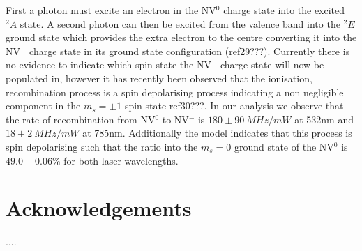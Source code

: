 \documentclass[prl]{revtex4}
\begin{document}
First a photon must excite an electron in the NV$^0$ charge state into the excited $^2A$ state. A second photon can then be excited from the valence band into the $^2E$ ground state which provides the extra electron to the centre converting it into the NV$^-$ charge state in its ground state configuration (ref29???). Currently there is no evidence to indicate which spin state the NV$^-$ charge state will now be populated in, however it has recently been observed that the ionisation, recombination process is a spin depolarising process indicating a non negligible component in the $m_s=\pm1$ spin state ref30???. In our analysis we observe that the rate of recombination from NV$^0$ to NV$^-$ is $180\pm\SI{90}{MHz/mW}$ at 532nm and $18\pm\SI{2}{MHz/mW}$ at 785nm. Additionally the model indicates that this process is spin depolarising such that the ratio into the $m_s=0$ ground state of the NV$^0$ is $49.0\pm0.06\%$ for both laser wavelengths.

\section*{Acknowledgements}

....

%
\appendix
\end{document}
